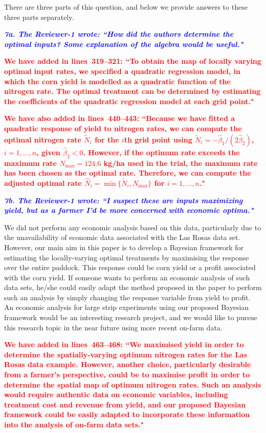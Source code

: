 \documentclass[a4paper]{article}   	%
\newcommand{\qtitle}[1]{\textit{\textbf{#1}}}
\begin{document}
\begin{enumerate}
    There are three parts of this question, and below we provide answers to these three parts separately. 
    
    \qtitle{\textcolor{blue}{7a. The Reviewer-1 wrote: ``How did the authors determine the optimal inputs? Some explanation of the algebra would be useful."}}
    
      \textcolor{red}{\textbf{We have added in lines~319--321: ``To obtain the map of locally varying optimal input rates, we specified a quadratic regression model, in which the corn yield is modelled as a quadratic function of the nitrogen rate. The optimal treatment can be determined by estimating the coefficients of the quadratic regression model at each grid point."}}
  
     \textcolor{red}{\textbf{We have also added in lines~440--443: ``Because we have fitted a quadratic response of yield to nitrogen rates, we can compute the optimal nitrogen rate $\tilde{N}_i$ for the $i$th grid point using $\tilde{N}_{i} = - \hat{\beta}_{1}/(2\hat{\beta}_{2})$, $i = 1, \ldots, n$, given $\hat{\beta}_{2} < 0$. However, if the optimum rate exceeds the maximum rate $N_{\mathrm{max}} = 124.6$ kg/ha used in the trial, the maximum rate has been chosen as the optimal rate. Therefore, we can compute the adjusted optimal rate $\hat{N}_{i} = \min\{\tilde{N}_{i}, N_{\mathrm{max}}\}$ for $i = 1, \ldots, n$."}}
     
     \qtitle{\textcolor{blue}{7b. The Reviewer-1 wrote: ``I suspect these are inputs maximizing yield, but as a farmer I'd be more concerned with economic optima."}}
     
     We did not perform any economic analysis based on this data, particularly due to the unavailability of economic data associated with the Las Rosas data set. However, our main aim in this paper is to develop a Bayesian framework for estimating the locally-varying optimal treatments by maximising the response over the entire paddock. This response could be corn yield or a profit associated with the corn yield. If someone wants to perform an economic analysis of such data sets, he/she could easily adapt the method proposed in the paper to perform such an analysis by simply changing the response variable from yield to profit. An economic analysis for large strip experiments using our proposed Bayesian framework would be an interesting research project, and we would like to pursue this research topic in the near future using more recent on-farm data.
     
      \textcolor{red}{\textbf{We have added in lines~463--468: ``We maximised yield in order to determine the spatially-varying optimum nitrogen rates for the Las Rosas data example. However, another choice, particularly desirable from a farmer's perspective, could be to maximise profit in order to determine the spatial map of optimum nitrogen rates. Such an analysis would require authentic data on economic variables, including treatment cost and revenue from yield, and our proposed Bayesian framework could be easily adapted to incorporate these information into the analysis of on-farm data sets."}}
      

\end{enumerate}
\end{document}
